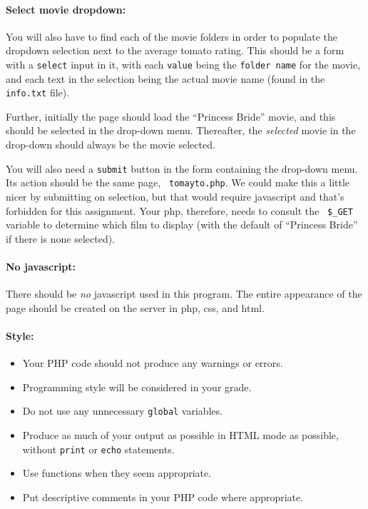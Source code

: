 \documentclass{article}
\begin{document}
\paragraph{Select movie dropdown:} You will also have to find each of the
movie folders in order to populate the dropdown selection next to the
average tomato rating.  This should be a form with a {\tt select}
input in it, with each {\tt value} being the {\tt folder name} for the
movie, and each text in the selection being the actual movie name
(found in the {\tt info.txt} file).

Further, initially the page should load the ``Princess Bride'' movie,
and this should be selected in the drop-down menu.  Thereafter, the
{\em selected} movie in the drop-down should always be the movie
selected.

You will also need a {\tt submit} button in the form containing the
drop-down menu.  Its action should be the same page, {\tt
  tomayto.php}.  We could make this a little nicer by submitting on
selection, but that would require javascript and that's forbidden for
this assignment.  Your php, therefore, needs to consult the {\tt
  \$\_GET} variable to determine which film to display (with the
default of ``Princess Bride'' if there is none selected).

  
\paragraph{No javascript:} There should be {\em no} javascript used in
this program.  The entire appearance of the page should be created on
the server in php, css, and html.

\paragraph{Style:}
\begin{itemize}
\item Your PHP code should not produce any warnings or
  errors.
\item Programming style will be considered in your grade.
\item Do not
  use any unnecessary {\tt global} variables.
\item  Produce as much of your
output as possible in HTML mode as possible, without {\tt print} or
{\tt echo} statements.
\item Use functions when they seem appropriate.
\item
Put descriptive comments in your PHP code where appropriate.
\end{itemize}
\end{document}

